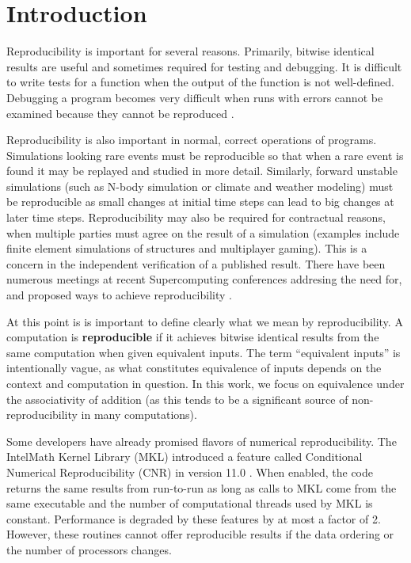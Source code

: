 \section{Introduction}
  Reproducibility is important for several reasons. Primarily, bitwise identical results are useful and sometimes required for testing and debugging. It is difficult to write tests for a function when the output of the function is not well-defined. Debugging a program becomes very difficult when runs with errors cannot be examined because they cannot be reproduced \cite{reproducibilityBOF}.

  Reproducibility is also important in normal, correct operations of programs. Simulations looking rare events must be reproducible so that when a rare event is found it may be replayed and studied in more detail. Similarly, forward unstable simulations (such as N-body simulation or climate and weather modeling) must be reproducible as small changes at initial time steps can lead to big changes at later time steps. Reproducibility may also be required for contractual reasons, when multiple parties must agree on the result of a simulation (examples include finite element simulations of structures and multiplayer gaming). This is a concern in the independent verification of a published result. There have been numerous meetings at recent Supercomputing conferences addresing the need for, and proposed ways to achieve reproducibility \cite{reproducibilityBOF}.

  At this point is is important to define clearly what we mean by reproducibility. A computation is \textbf{reproducible} if it achieves bitwise identical results from the same computation when given equivalent inputs. The term ``equivalent inputs'' is intentionally vague, as what constitutes equivalence of inputs depends on the context and computation in question. In this work, we focus on equivalence under the associativity of addition (as this tends to be a significant source of non-reproducibility in many computations). 

  Some developers have already promised flavors of numerical reproducibility. The Intel\textregistered Math Kernel Library (MKL) introduced a feature called Conditional Numerical Reproducibility (CNR) in version 11.0 \cite{MKL}. When enabled, the code returns the same results from run-to-run as long as calls to MKL come from the same executable and the number of computational threads used by MKL is constant. Performance is degraded by these features by at most a factor of 2. However, these routines cannot offer reproducible results if the data ordering or the number of processors changes.

